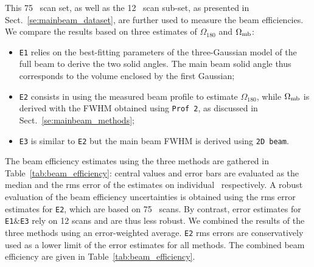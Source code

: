This 75 \bm\ scan set, as well as the 12 \bm\ scan sub-set, as
presented in Sect.~\ref{se:mainbeam_dataset}, are further used to
measure the beam
efficiencies. We compare the results based on three estimates of
$\Omega_{180}$ and $\Omega_{\rm{mb}}$:
\begin{itemize}
  \item{{\tt E1} relies on the best-fitting parameters of the
    three-Gaussian model of the full beam to derive the two solid
    angles. The main beam solid angle thus corresponds to the volume
    enclosed by the first Gaussian;}
  \item{{\tt E2} consists in using the measured beam profile to
    estimate $\Omega_{180}$, while $\Omega_{\rm{mb}}$ is derived with the FWHM obtained using {\tt Prof 2}, as discussed in Sect.~\ref{se:mainbeam_methods};}
  \item{{\tt E3} is similar to {\tt E2} but the main beam FWHM is
    derived using {\tt 2D beam}.}  
\end{itemize}

The beam efficiency estimates using the three methods are gathered
in Table~\ref{tab:beam_efficiency}: central values and error
bars are evaluated as the median and the rms error of the
estimates on individual \bms\ respectively. A robust evaluation of the
beam efficiency uncertainties is obtained using the rms error estimates
for {\tt E2}, which are based on 75 \bm\ scans. By contrast, error
estimates for {\tt E1$\&$E3} rely on 12 scans and are thus less
robust. We combined the results of the three methods using an error-weighted
average. {\tt E2} rms errors are conservatively used as a lower
limit of the error estimates for all methods. The combined beam
efficiency are given in Table~\ref{tab:beam_efficiency}.  


